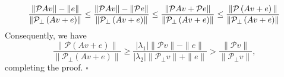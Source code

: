 \documentclass[10pt,a4paper]{amsart}
\def\P{\mathcal{P}}
\newenvironment{proof}{{\noindent \bf \em Proof:}}{\hfill$\square$}
\begin{document}
\begin{proof}
\begin{equation}
\frac{\| \P Av\| - \|e\|}{ \left\|\P_{\perp} \left(Av + e\right) \right\|} 
\leq \frac{\| \P Av\| - \|\P e\|}{ \left\|\P_{\perp} \left(Av + e\right) \right\|} 
\leq \frac{\| \P Av + \P e\|}{ \left\|\P_{\perp} \left(Av + e\right) \right\|} \\
\leq \frac{\| \P \left(Av + e\right)\|}{ \left\|\P_{\perp} \left(Av + e\right) \right\|} 
\end{equation}
Consequently, we have 
\begin{equation}
\frac{\| \P \left(Av + e\right)\|}{ \left\|\P_{\perp} \left(Av + e\right) \right\|}  \geq \frac{|\lambda_1| \|\P v\| - \|e\|}{|\lambda_2| \|\P_{\perp} v\| + \|e\|} > \frac{\|\P v\|}{\|\P_{\perp} v\|}, 
\end{equation} 
completing the proof. 
\end{proof}
\end{document}

